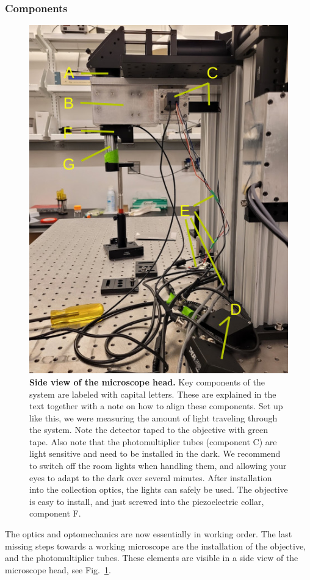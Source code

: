 \documentclass[10pt,letterpaper]{article}
\begin{document}
\subsubsection{Components}
%
\begin{figure}
    \includegraphics[width=.5\textwidth]{sfig6.jpg}
  \caption{{\bf Side view of the microscope head.} Key components of the system are labeled with capital letters. These are explained in the text together with a note on how to align these components.\newline
  Set up like this, we were measuring the amount of light traveling through the system. Note the detector taped to the objective with green tape.\newline
  Also note that the photomultiplier tubes (component C) are light sensitive and need to be installed in the dark. We recommend to switch off the room lights when handling them, and allowing your eyes to adapt to the dark over several minutes. After installation into the collection optics, the lights can safely be used. The objective is easy to install, and just screwed into the piezoelectric collar, component F.}
  \label{sfig6}
\end{figure}
%
The optics and optomechanics are now essentially in working order. The last missing steps towards a working microscope are the installation of the objective, and the photomultiplier tubes. These elements are visible in a side view of the microscope head, see Fig.~\ref{sfig6}.
%
\end{document}
